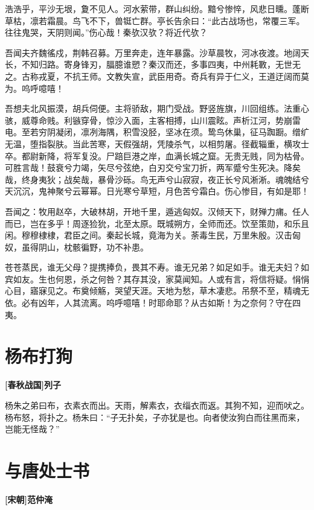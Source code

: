 \documentclass[UTF8,titlepage,oneside]{ctexbook}
\begin{document}
浩浩乎，平沙无垠，夐不见人。河水萦带，群山纠纷。黯兮惨悴，风悲日曛。蓬断草枯，凛若霜晨。鸟飞不下，兽铤亡群。亭长告余曰：“此古战场也，常覆三军。往往鬼哭，天阴则闻。”伤心哉！秦欤汉欤？将近代欤？

吾闻夫齐魏徭戍，荆韩召募。万里奔走，连年暴露。沙草晨牧，河冰夜渡。地阔天长，不知归路。寄身锋刃，腷臆谁愬？秦汉而还，多事四夷，中州耗斁，无世无之。古称戎夏，不抗王师。文教失宣，武臣用奇。奇兵有异于仁义，王道迂阔而莫为。呜呼噫嘻！

吾想夫北风振漠，胡兵伺便。主将骄敌，期门受战。野竖旌旗，川回组练。法重心骇，威尊命贱。利镞穿骨，惊沙入面，主客相搏，山川震眩。声析江河，势崩雷电。至若穷阴凝闭，凛冽海隅，积雪没胫，坚冰在须。鸷鸟休巢，征马踟蹰。缯纩无温，堕指裂肤。当此苦寒，天假强胡，凭陵杀气，以相剪屠。径截辎重，横攻士卒。都尉新降，将军复没。尸踣巨港之岸，血满长城之窟。无贵无贱，同为枯骨。可胜言哉！鼓衰兮力竭，矢尽兮弦绝，白刃交兮宝刀折，两军蹙兮生死决。降矣哉，终身夷狄；战矣哉，暴骨沙砾。鸟无声兮山寂寂，夜正长兮风淅淅。魂魄结兮天沉沉，鬼神聚兮云幂幂。日光寒兮草短，月色苦兮霜白。伤心惨目，有如是耶！

吾闻之：牧用赵卒，大破林胡，开地千里，遁逃匈奴。汉倾天下，财殚力痡。任人而已，岂在多乎！周逐猃狁，北至太原。既城朔方，全师而还。饮至策勋，和乐且闲。穆穆棣棣，君臣之间。秦起长城，竟海为关。荼毒生民，万里朱殷。汉击匈奴，虽得阴山，枕骸徧野，功不补患。

苍苍蒸民，谁无父母？提携捧负，畏其不寿。谁无兄弟？如足如手。谁无夫妇？如宾如友。生也何恩，杀之何咎？其存其没，家莫闻知。人或有言，将信将疑。悁悁心目，寤寐见之。布奠倾觞，哭望天涯。天地为愁，草木凄悲。吊祭不至，精魂无依。必有凶年，人其流离。呜呼噫嘻！时耶命耶？从古如斯！为之奈何？守在四夷。


\chapter*{杨布打狗}
\begin{center}
	\textbf{[春秋战国]列子}
\end{center}

杨朱之弟曰布，衣素衣而出。天雨，解素衣，衣缁衣而返。其狗不知，迎而吠之。杨布怒，将扑之。杨朱曰：“子无扑矣，子亦犹是也。向者使汝狗白而往黑而来，岂能无怪哉？”


\chapter*{与唐处士书}
\begin{center}
	\textbf{[宋朝]范仲淹}
\end{center}
\end{document}
